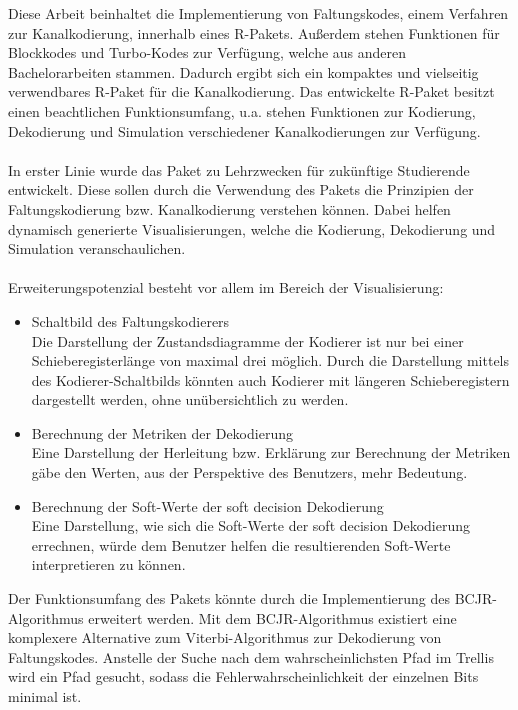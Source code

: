 Diese Arbeit beinhaltet die Implementierung von Faltungskodes, einem Verfahren zur Kanalkodierung, innerhalb eines R-Pakets. Außerdem stehen Funktionen für Blockkodes und Turbo-Kodes zur Verfügung, welche aus anderen Bachelorarbeiten stammen. Dadurch ergibt sich ein kompaktes und vielseitig verwendbares R-Paket für die Kanalkodierung. Das entwickelte R-Paket besitzt einen beachtlichen Funktionsumfang, u.a. stehen Funktionen zur Kodierung, Dekodierung und Simulation verschiedener Kanalkodierungen zur Verfügung.
\\
\\
In erster Linie wurde das Paket zu Lehrzwecken für zukünftige Studierende entwickelt. Diese sollen durch die Verwendung des Pakets die Prinzipien der Faltungskodierung bzw. Kanalkodierung verstehen können. Dabei helfen dynamisch generierte Visualisierungen, welche die Kodierung, Dekodierung und Simulation veranschaulichen.
\\
\\
Erweiterungspotenzial besteht vor allem im Bereich der Visualisierung:
\begin{itemize}
\item Schaltbild des Faltungskodierers\\Die Darstellung der Zustandsdiagramme der Kodierer ist nur bei einer Schieberegisterlänge von maximal drei möglich. Durch die Darstellung mittels des Kodierer-Schaltbilds könnten auch Kodierer mit längeren Schieberegistern dargestellt werden, ohne unübersichtlich zu werden.
\item Berechnung der Metriken der Dekodierung\\Eine Darstellung der Herleitung bzw. Erklärung zur Berechnung der Metriken gäbe den Werten, aus der Perspektive des Benutzers, mehr Bedeutung.
\item Berechnung der Soft-Werte der soft decision Dekodierung\\Eine Darstellung, wie sich die Soft-Werte der soft decision Dekodierung errechnen, würde dem Benutzer helfen die resultierenden Soft-Werte interpretieren zu können.
\end{itemize}
Der Funktionsumfang des Pakets könnte durch die Implementierung des BCJR-Algorithmus erweitert werden. Mit dem BCJR-Algorithmus existiert eine komplexere Alternative zum Viterbi-Algorithmus zur Dekodierung von Faltungskodes. Anstelle der Suche nach dem wahrscheinlichsten Pfad im Trellis wird ein Pfad gesucht, sodass die Fehlerwahrscheinlichkeit der einzelnen Bits minimal ist.~\cite[S.~233~ff.]{schonfeld2012informations}